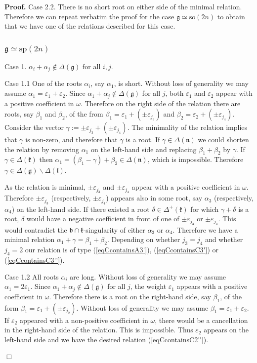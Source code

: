 \documentclass[12pt]{report}
\newenvironment{proof}[1][]{ \textbf{Proof#1. }}{$\Box$\medskip}
\newcommand{\kk}{\mathfrak{k}}
\newcommand{\nn}{\mathfrak{n}}
\newcommand{\gG}{\mathfrak{g}}
\newcommand{\bb}{\mathfrak{b}}
\newcommand{\lL}{\mathfrak{l}}
\newcommand{\refeq}[1]{(\ref{#1})}
\newcommand{\sP}{\mathrm{sp}}
\newcommand{\so}{\mathrm{so}}
\newcommand{\eps}{\varepsilon}
\newcommand{\pmf}[1]{ \pm}%
\begin{document}
\begin{proof}
\noindent Case 2.2. There is no short root on either side of the minimal relation. Therefore we can repeat verbatim the proof for the case $\gG\simeq \so(2n)$ to obtain that we have one of the relations described for this case. 
\subsubsection{$\gG\simeq\sP(2n)$}
\smallskip\noindent Case 1. $\alpha_i+\alpha_j\notin \Delta(\gG)$ for all $i,j$.

\smallskip\noindent Case 1.1 One of the roots $\alpha_i$, say $\alpha_1$, is short. Without loss of generality we may assume $\alpha_1= \eps_{1}+ \eps_{2}$. Since $\alpha_1+\alpha_j\notin\Delta(\gG)$ for all $j$, both $\eps_{1}$ and $\eps_2$ appear with a positive coefficient in $\omega$. Therefore on the right side of the relation there are roots, say $\beta_1$ and $\beta_2$, of the from $\beta_{1} =\eps_{1}+(\pmf{j_3}\eps_{j_3})$ and $\beta_2=\eps_{2} +(\pmf{j_4} \eps_{j_4})$. Consider the vector $\gamma:= \pmf{j_3} \eps_{j_3}+ (\pmf{j_4} \eps_{j_4})$. The minimality of the relation implies that $\gamma$ is non-zero, and therefore that $\gamma$ is a root. If $\gamma\in\Delta(\nn)$ we could shorten the relation by removing $\alpha_1$ on the left-hand side and replacing $\beta_1 + \beta_2$ by $\gamma$. If $\gamma\in\Delta(\kk)$ then $\alpha_1 = (\beta_1- \gamma ) +\beta_2\in\Delta(\nn)$, which is impossible. Therefore $\gamma\in\Delta(\gG)\backslash\Delta(\lL)$. 

As the relation is minimal, $\pmf{j_3}\eps_{j_3}$ and $\pmf{j_4}\eps_{j_4}$  appear with a positive coefficient in $\omega$. Therefore $\pmf{j_3}\eps_{j_3}$ (respectively, $\pmf{j_4}\eps_{j_4}$) appears also in some root, say $\alpha_3$ (respectively, $\alpha_4$) on the left-hand side. If there existed a root $\delta\in\Delta^+(\kk)$ for which $\gamma+\delta$ is a root, $\delta$ would have a negative coefficient in front of one of $\pmf{j_3}\eps_{j_3}$ or $\pmf{j_4}\eps_{j_4}$. This would contradict the $\bb\cap\kk$-singularity of either $\alpha_{3}$ or $\alpha_{4}$. Therefore we have a minimal relation $\alpha_1+\gamma=\beta_1+\beta_2$. Depending on whether $j_3=j_4$ and whether $j_4=2$ our relation is of type \refeq{eqCcontainsA3'}, \refeq{eqCcontainsC3'} or \refeq{eqCcontainsC3''}.

\smallskip\noindent Case 1.2 All roots $\alpha_i$ are long. Without loss of generality we may assume $\alpha_1=2\eps_{1}$. Since $\alpha_1+\alpha_j\notin\Delta(\gG)$ for all $j$, the weight  $\eps_{1}$ appears with a positive coefficient in $\omega$. Therefore there is a root on the right-hand side, say $\beta_1$, of the form $\beta_1 =\eps_{1}+(\pmf{j_2}\eps_{j_2})$. Without loss of generality we may assume $\beta_1=\eps_1+\eps_2$. If $\eps_{ 2}$ appeared with a non-positive coefficient in $\omega$, there would be a cancellation in the right-hand side of the relation. This is impossible. Thus $\eps_{2}$ appears on the left-hand side and we have the desired relation \refeq{eqCcontainsC2''}.


\end{proof}
\end{document}
